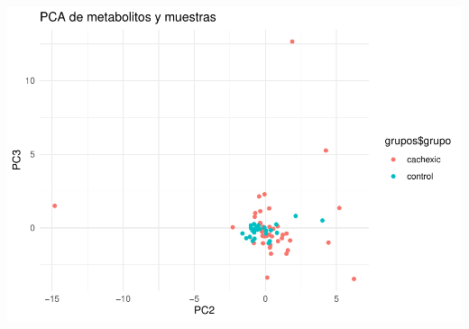 \documentclass[
]{article}
\begin{document}
\includegraphics{PEC1_files/figure-latex/unnamed-chunk-11-3.pdf}
\end{document}
